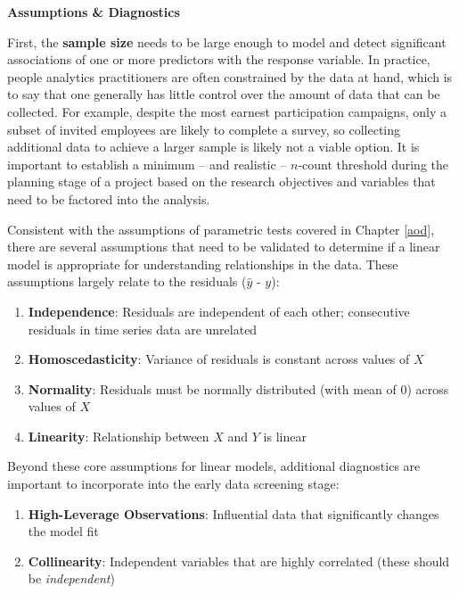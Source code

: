 \documentclass[
]{book}
\providecommand{\tightlist}{%
  \setlength{\itemsep}{0pt}\setlength{\parskip}{0pt}}
\begin{document}
\textbf{Assumptions \& Diagnostics}

First, the \textbf{sample size} needs to be large enough to model and detect significant associations of one or more predictors with the response variable. In practice, people analytics practitioners are often constrained by the data at hand, which is to say that one generally has little control over the amount of data that can be collected. For example, despite the most earnest participation campaigns, only a subset of invited employees are likely to complete a survey, so collecting additional data to achieve a larger sample is likely not a viable option. It is important to establish a minimum -- and realistic -- \(n\)-count threshold during the planning stage of a project based on the research objectives and variables that need to be factored into the analysis.

Consistent with the assumptions of parametric tests covered in Chapter \ref{aod}, there are several assumptions that need to be validated to determine if a linear model is appropriate for understanding relationships in the data. These assumptions largely relate to the residuals (\(\hat{y}\) - \(y\)):

\begin{enumerate}
\def\labelenumi{\arabic{enumi}.}
\tightlist
\item
  \textbf{Independence}: Residuals are independent of each other; consecutive residuals in time series data are unrelated
\item
  \textbf{Homoscedasticity}: Variance of residuals is constant across values of \(X\)
\item
  \textbf{Normality}: Residuals must be normally distributed (with mean of 0) across values of \(X\)
\item
  \textbf{Linearity}: Relationship between \(X\) and \(Y\) is linear
\end{enumerate}

Beyond these core assumptions for linear models, additional diagnostics are important to incorporate into the early data screening stage:

\begin{enumerate}
\def\labelenumi{\arabic{enumi}.}
\tightlist
\item
  \textbf{High-Leverage Observations}: Influential data that significantly changes the model fit
\item
  \textbf{Collinearity}: Independent variables that are highly correlated (these should be \emph{independent})
\end{enumerate}
\end{document}
